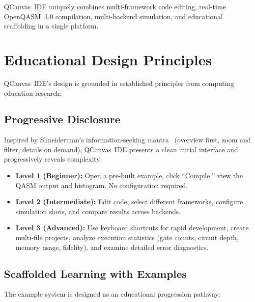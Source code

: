 \documentclass[conference]{IEEEtran}
\begin{document}
QCanvas~IDE uniquely combines multi-framework code editing, real-time OpenQASM~3.0 compilation, multi-backend simulation, and educational scaffolding in a single platform.

\section{Educational Design Principles}
\label{sec:design}

QCanvas~IDE's design is grounded in established principles from computing education research:

\subsection{Progressive Disclosure}

Inspired by Shneiderman's information-seeking mantra~\cite{shneiderman1996eyes} (overview first, zoom and filter, details on demand), QCanvas~IDE presents a clean initial interface and progressively reveals complexity:

\begin{itemize}
    \item \textbf{Level 1 (Beginner):} Open a pre-built example, click ``Compile,'' view the QASM output and histogram. No configuration required.
    \item \textbf{Level 2 (Intermediate):} Edit code, select different frameworks, configure simulation shots, and compare results across backends.
    \item \textbf{Level 3 (Advanced):} Use keyboard shortcuts for rapid development, create multi-file projects, analyze execution statistics (gate counts, circuit depth, memory usage, fidelity), and examine detailed error diagnostics.
\end{itemize}

\subsection{Scaffolded Learning with Examples}

The example system is designed as an educational progression pathway:
\end{document}
